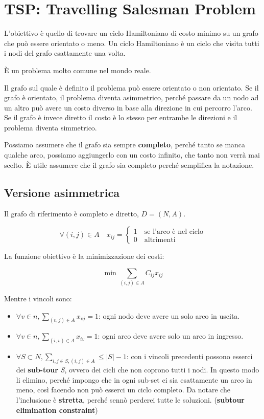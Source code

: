 

\section{TSP: Travelling Salesman Problem}

L'obiettivo è quello di trovare un ciclo Hamiltoniano di costo minimo su un grafo che può essere orientato o meno.
Un ciclo Hamiltoniano è un ciclo che visita tutti i nodi del grafo esattamente una volta.

\`E un problema molto comune nel mondo reale.

Il grafo sul quale è definito il problema può essere orientato o non orientato. Se il grafo è orientato, il problema diventa asimmetrico, perché passare da un nodo ad un altro può avere un costo diverso in base alla direzione in cui percorro l'arco. Se il grafo è invece diretto il costo è lo stesso per entrambe le direzioni e il problema diventa simmetrico.

Possiamo assumere che il grafo sia sempre \textbf{completo}, perché tanto se manca qualche arco, possiamo aggiungerlo con un costo infinito, che tanto non verrà mai scelto.
\`E utile assumere che il grafo sia completo perché semplifica la notazione.

\subsection{Versione asimmetrica}

Il grafo di riferimento è completo e diretto, $D = (N,A)$.

$$
\forall(i,j) \in A \quad x_{ij} = \begin{cases}
1 \quad \text{se l'arco è nel ciclo} \\
0 \quad \text{altrimenti}
\end{cases}
$$

La funzione obiettivo è la minimizzazione dei costi:

$$
\min \sum_{(i,j) \in A} C_{ij} x_{ij}
$$

Mentre i vincoli sono:

\begin{itemize}
	\item $ \forall v \in n, \sum_{(v,j) \in A} x_{vj} = 1 $: ogni nodo deve avere un solo arco in uscita.
	\item $ \forall v \in n, \sum_{(i,v) \in A} x_{iv} = 1 $: ogni arco deve avere solo un arco in ingresso.
	\item $ \forall S \subset N, \sum_{i, j \in S, (i,j) \in A} \leq |S|-1$: con i vincoli precedenti possono esserci dei \textbf{sub-tour} \textit{S}, ovvero dei cicli che non coprono tutti i nodi. In questo modo li elimino, perché impongo che in ogni sub-set ci sia esattamente un arco in meno, così facendo non può esserci un ciclo completo. Da notare che l'inclusione è \textbf{stretta}, perché sennò perderei tutte le soluzioni. (\textbf{subtour elimination constraint})
\end{itemize}

